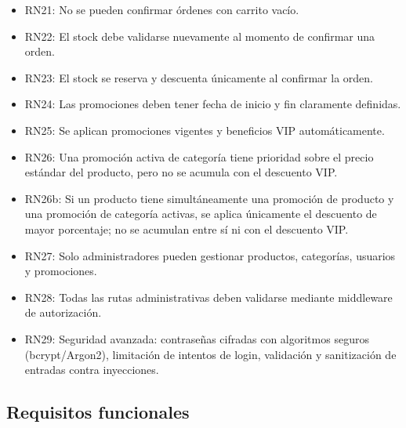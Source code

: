 \documentclass[12pt,a4paper]{article}
\begin{document}
\begin{itemize}[label=--]
    \item RN21: No se pueden confirmar órdenes con carrito vacío.
    \item RN22: El stock debe validarse nuevamente al momento de confirmar una orden.
    \item RN23: El stock se reserva y descuenta únicamente al confirmar la orden.
    \item RN24: Las promociones deben tener fecha de inicio y fin claramente definidas.
    \item RN25: Se aplican promociones vigentes y beneficios VIP automáticamente.
    \item RN26: Una promoción activa de categoría tiene prioridad sobre el precio estándar del producto, pero no se acumula con el descuento VIP.
    \item RN26b: Si un producto tiene simultáneamente una promoción de producto y una promoción de categoría activas, se aplica únicamente el descuento de mayor porcentaje; no se acumulan entre sí ni con el descuento VIP.
    \item RN27: Solo administradores pueden gestionar productos, categorías, usuarios y promociones.
    \item RN28: Todas las rutas administrativas deben validarse mediante middleware de autorización.
    \item RN29: Seguridad avanzada: contraseñas cifradas con algoritmos seguros (bcrypt/Argon2), limitación de intentos de login, validación y sanitización de entradas contra inyecciones.
\end{itemize}



\subsection{Requisitos funcionales}
\end{document}
